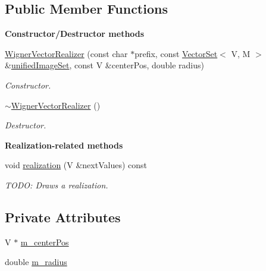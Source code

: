 \subsection*{Public Member Functions}
\begin{Indent}{\bf Constructor/\-Destructor methods}\par
\begin{DoxyCompactItemize}
\item 
\hyperlink{class_q_u_e_s_o_1_1_wigner_vector_realizer_a44b2d353c8c82a0968d07c18ea40b69f}{Wigner\-Vector\-Realizer} (const char $\ast$prefix, const \hyperlink{class_q_u_e_s_o_1_1_vector_set}{Vector\-Set}$<$ V, M $>$ \&\hyperlink{class_q_u_e_s_o_1_1_base_vector_realizer_ad958991bab8d6369e8a0d66b22a237d4}{unified\-Image\-Set}, const V \&center\-Pos, double radius)
\begin{DoxyCompactList}\small\item\em Constructor. \end{DoxyCompactList}\item 
\hyperlink{class_q_u_e_s_o_1_1_wigner_vector_realizer_a52de4d73111dd2831e7099c782220ed6}{$\sim$\-Wigner\-Vector\-Realizer} ()
\begin{DoxyCompactList}\small\item\em Destructor. \end{DoxyCompactList}\end{DoxyCompactItemize}
\end{Indent}
\begin{Indent}{\bf Realization-\/related methods}\par
\begin{DoxyCompactItemize}
\item 
void \hyperlink{class_q_u_e_s_o_1_1_wigner_vector_realizer_a0d72232eb5843e78fc3d02a510ceb966}{realization} (V \&next\-Values) const 
\begin{DoxyCompactList}\small\item\em T\-O\-D\-O\-: Draws a realization. \end{DoxyCompactList}\end{DoxyCompactItemize}
\end{Indent}
\subsection*{Private Attributes}
\begin{DoxyCompactItemize}
\item 
V $\ast$ \hyperlink{class_q_u_e_s_o_1_1_wigner_vector_realizer_afe5a5ae0e04ca222b2d1c9b84a297896}{m\-\_\-center\-Pos}
\item 
double \hyperlink{class_q_u_e_s_o_1_1_wigner_vector_realizer_af325e618f0f529af2a2f26649be101a4}{m\-\_\-radius}
\end{DoxyCompactItemize}
